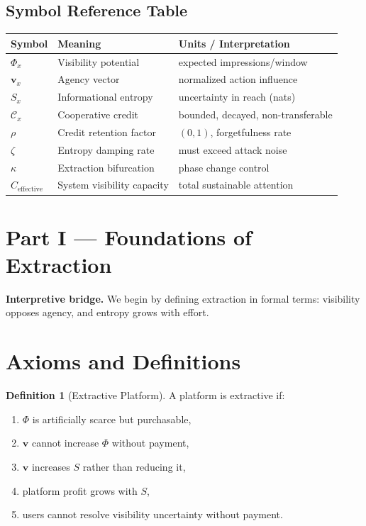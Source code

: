 \documentclass[11pt,a4paper]{article}
\theoremstyle{plain}
\theoremstyle{definition}
\newtheorem{definition}{Definition}[section]
\theoremstyle{remark}
\newcommand{\vvec}{\mathbf{v}}
\newcommand{\Entropy}{S}
\begin{document}
\subsection{Symbol Reference Table}

\begin{center}
\begin{tabular}{l l l}
\toprule
Symbol & Meaning & Units / Interpretation \\
\midrule
$\Phi_x$ & Visibility potential & expected impressions/window \\
$\vvec_x$ & Agency vector & normalized action influence \\
$\Entropy_x$ & Informational entropy & uncertainty in reach (nats) \\
$\mathcal{C}_x$ & Cooperative credit & bounded, decayed, non-transferable \\
$\rho$ & Credit retention factor & $(0,1)$, forgetfulness rate \\
$\zeta$ & Entropy damping rate & must exceed attack noise \\
$\kappa$ & Extraction bifurcation & phase change control \\
$C_{\text{effective}}$ & System visibility capacity & total sustainable attention \\
\bottomrule
\end{tabular}
\end{center}


\section*{Part I — Foundations of Extraction}

\noindent\textbf{Interpretive bridge.}  
We begin by defining extraction in formal terms: visibility opposes agency, and entropy grows with effort.

\section{Axioms and Definitions}

\begin{definition}[Extractive Platform]
A platform is extractive if:
\begin{enumerate}
    \item $\Phi$ is artificially scarce but purchasable,
    \item $\vvec$ cannot increase $\Phi$ without payment,
    \item $\vvec$ increases $\Entropy$ rather than reducing it,
    \item platform profit grows with $\Entropy$,
    \item users cannot resolve visibility uncertainty without payment.
\end{enumerate}
\end{definition}
\end{document}

